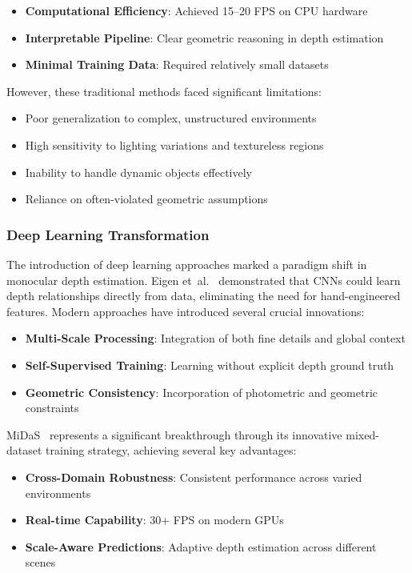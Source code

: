 \documentclass[12pt,oneside]{book}
\begin{document}
\begin{itemize}
    \item \textbf{Computational Efficiency}: Achieved 15--20 FPS on CPU hardware
    \item \textbf{Interpretable Pipeline}: Clear geometric reasoning in depth estimation
    \item \textbf{Minimal Training Data}: Required relatively small datasets
\end{itemize}

However, these traditional methods faced significant limitations:
\begin{itemize}
    \item Poor generalization to complex, unstructured environments
    \item High sensitivity to lighting variations and textureless regions
    \item Inability to handle dynamic objects effectively
    \item Reliance on often-violated geometric assumptions
\end{itemize}

\subsubsection{Deep Learning Transformation}
The introduction of deep learning approaches marked a paradigm shift in monocular depth estimation. Eigen et~al.~\cite{eigen2014depth} demonstrated that CNNs could learn depth relationships directly from data, eliminating the need for hand-engineered features. Modern approaches have introduced several crucial innovations:

\begin{itemize}
    \item \textbf{Multi-Scale Processing}: Integration of both fine details and global context
    \item \textbf{Self-Supervised Training}: Learning without explicit depth ground truth
    \item \textbf{Geometric Consistency}: Incorporation of photometric and geometric constraints
\end{itemize}

MiDaS~\cite{ranftl2020towards} represents a significant breakthrough through its innovative mixed-dataset training strategy, achieving several key advantages:

\begin{itemize}
    \item \textbf{Cross-Domain Robustness}: Consistent performance across varied environments
    \item \textbf{Real-time Capability}: 30+ FPS on modern GPUs
    \item \textbf{Scale-Aware Predictions}: Adaptive depth estimation across different scenes
\end{itemize}
\end{document}
